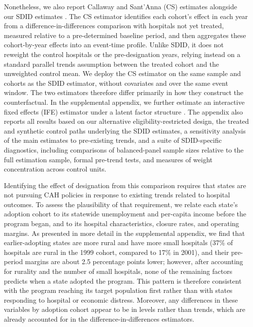 \documentclass[a4paper, 12pt, twoside]{article}
\begin{document}
Nonetheless, we also report Callaway and Sant'Anna (CS) estimates alongside our SDID estimates \citep{callaway2021}. The CS estimator identifies each cohort's effect in each year from a difference-in-differences comparison with hospitals not yet treated, measured relative to a pre-determined baseline period, and then aggregates these cohort-by-year effects into an event-time profile. Unlike SDID, it does not reweight the control hospitals or the pre-designation years, relying instead on a standard parallel trends assumption between the treated cohort and the unweighted control mean. We deploy the CS estimator on the same sample and cohorts as the SDID estimator, without covariates and over the same event window. The two estimators therefore differ primarily in how they construct the counterfactual. In the supplemental appendix, we further estimate an interactive fixed effects (IFE) estimator under a latent factor structure \citep{xu2017}. The appendix also reports all results based on our alternative eligibility-restricted design, the treated and synthetic control paths underlying the SDID estimates, a sensitivity analysis of the main estimates to pre-existing trends, and a suite of SDID-specific diagnostics, including comparisons of balanced-panel sample sizes relative to the full estimation sample, formal pre-trend tests, and measures of weight concentration across control units.

Identifying the effect of designation from this comparison requires that states are not pursuing CAH policies in response to existing trends related to hospital outcomes. To assess the plausibility of that requirement, we relate each state's adoption cohort to its statewide unemployment and per-capita income before the program began, and to its hospital characteristics, closure rates, and operating margins. As presented in more detail in the supplemental appendix, we find that earlier-adopting states are more rural and have more small hospitals (37\% of hospitals are rural in the 1999 cohort, compared to 17\% in 2001), and their pre-period margins are about 2.5 percentage points lower; however, after accounting for rurality and the number of small hospitals, none of the remaining factors predicts when a state adopted the program. This pattern is therefore consistent with the program reaching its target population first rather than with states responding to hospital or economic distress. Moreover, any differences in these variables by adoption cohort appear to be in levels rather than trends, which are already accounted for in the difference-in-differences estimators.
\end{document}
